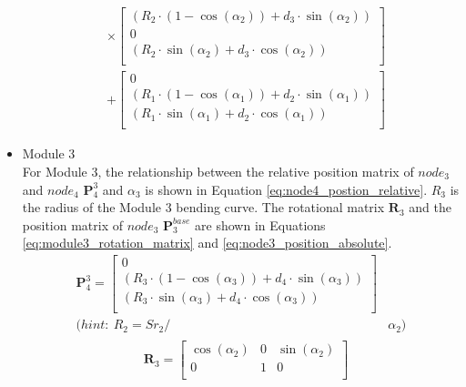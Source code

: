 \begin{itemize}
\begin{align}
        &\times
        \begin{bmatrix}
            (R_2\cdot(1-\cos(\alpha_2)) + d_3\cdot \sin(\alpha_2)) \\
            0 \\
            (R_2\cdot \sin(\alpha_2) + d_3\cdot \cos(\alpha_2)) \\
        \end{bmatrix} \nonumber \\
        &+
        \begin{bmatrix}
            0 \\
            (R_1\cdot(1-\cos(\alpha_1)) + d_2\cdot \sin(\alpha_1)) \\
            (R_1\cdot \sin(\alpha_1) + d_2\cdot \cos(\alpha_1)) \\
        \end{bmatrix}
        \label{eq:node3_position_absolute}
    \end{align}
    \item Module 3 \\
    For Module 3, the relationship between the relative position matrix of $node_3$ and $node_4$ $\textbf{P}_{4}^{3}$ 
    and $\alpha_3$ is shown in Equation \ref{eq:node4_postion_relative}. $R_3$ is the radius of the Module 3 bending 
    curve. The rotational matrix $\textbf{R}_{3}$ and the position matrix of $node_3$ $\textbf{P}_{3}^{base}$ are shown 
    in Equations \ref*{eq:module3_rotation_matrix} and \ref{eq:node3_position_absolute}.
    \begin{align}
        \textbf{P}_{4}^{3} = 
        \begin{bmatrix}
            0 \\
            (R_3\cdot(1-\cos(\alpha_3)) + d_4\cdot \sin(\alpha_3)) \\
            (R_3\cdot \sin(\alpha_3) + d_4\cdot \cos(\alpha_3)) \\
        \end{bmatrix}&
        \label{eq:node4_postion_relative} \\
        \nonumber (hint: \ R_2 = {Sr}_2/ &\alpha_2)
    \end{align}
    \vspace{-15mm}
    \begin{align}
        &\begin{aligned}
            \textbf{R}_{3} = 
            \begin{bmatrix}
                \cos(\alpha_2) & 0 & \sin(\alpha_2) \\
                0 & 1 & 0 \\

\end{bmatrix}
\end{aligned}
\end{align}
\end{itemize}
